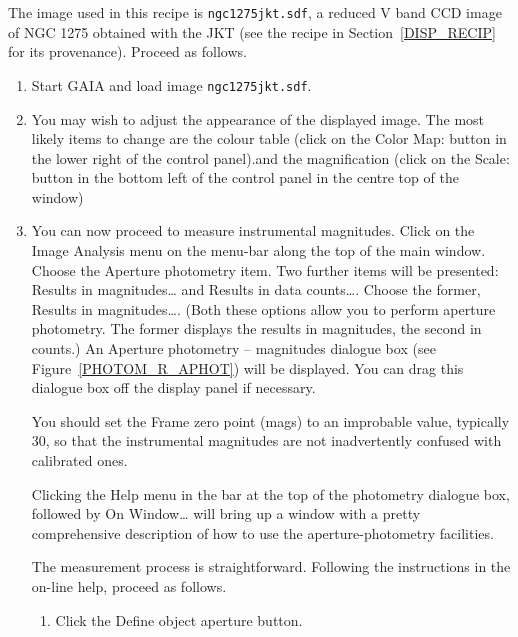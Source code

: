 \documentclass[twoside,11pt]{starlink}
\begin{document}
The image used in this recipe is \texttt{ngc1275jkt.sdf}, a reduced V band
CCD image of NGC 1275 obtained with the JKT (see the recipe in
Section~\ref{DISP_RECIP} for its provenance).  Proceed as follows.

\begin{enumerate}

  \item Start GAIA and load image \texttt{ngc1275jkt.sdf}.

  \item You may wish to adjust the appearance of the displayed image.
   The most likely items to change are the colour table (click on the \textsf{Color Map:} button in the lower right of the control panel).and the
   magnification (click on the \textsf{Scale:} button in the bottom left of
   the control panel in the centre top of the window)

  \item You can now proceed to measure instrumental magnitudes.  Click on
   the \textsf{Image Analysis} menu on the menu-bar along the top of the main
   window.  Choose the \textsf{Aperture photometry} item.  Two further items
   will be presented: \textsf{Results in magnitudes\ldots} and \textsf{Results
   in data counts\ldots}.  Choose the former, \textsf{Results in
   magnitudes\ldots}.  (Both these options allow you to perform aperture
   photometry.  The former displays the results in magnitudes, the second
   in counts.)  An \textsf{Aperture photometry -- magnitudes} dialogue box
   (see Figure~\ref{PHOTOM_R_APHOT}) will be displayed.  You can drag this
   dialogue box off the display panel if necessary.

   You should set the \textsf{Frame zero point (mags)} to an improbable value,
   typically 30, so that the instrumental magnitudes are not inadvertently
   confused with calibrated ones.

   Clicking the \textsf{Help} menu in the bar at the top of the photometry
   dialogue box, followed by \textsf{On Window\ldots} will bring up a window
   with a pretty comprehensive description of how to use the
   aperture-photometry facilities.

   The measurement process is straightforward.  Following the instructions
   in the on-line help, proceed as follows.

  \begin{enumerate}

     \item Click the \textsf{Define object aperture} button.


\end{enumerate}
\end{enumerate}
\end{document}
